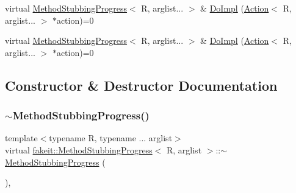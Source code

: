 \begin{DoxyCompactItemize}
\item 
virtual \mbox{\hyperlink{structfakeit_1_1MethodStubbingProgress}{Method\+Stubbing\+Progress}}$<$ R, arglist... $>$ \& \mbox{\hyperlink{structfakeit_1_1MethodStubbingProgress_a73218fd396f0096f93462f2d4656c509}{Do\+Impl}} (\mbox{\hyperlink{structfakeit_1_1Action}{Action}}$<$ R, arglist... $>$ $\ast$action)=0
\item 
virtual \mbox{\hyperlink{structfakeit_1_1MethodStubbingProgress}{Method\+Stubbing\+Progress}}$<$ R, arglist... $>$ \& \mbox{\hyperlink{structfakeit_1_1MethodStubbingProgress_a73218fd396f0096f93462f2d4656c509}{Do\+Impl}} (\mbox{\hyperlink{structfakeit_1_1Action}{Action}}$<$ R, arglist... $>$ $\ast$action)=0
\end{DoxyCompactItemize}


\subsection{Constructor \& Destructor Documentation}
\mbox{\label{structfakeit_1_1MethodStubbingProgress_aed2c96ce537706935976943354c49616}} 
\subsubsection{\texorpdfstring{$\sim$MethodStubbingProgress()}{~MethodStubbingProgress()}\hspace{0.1cm}{\footnotesize\ttfamily [1/9]}}
{\footnotesize\ttfamily template$<$typename R, typename ... arglist$>$ \\
virtual \mbox{\hyperlink{structfakeit_1_1MethodStubbingProgress}{fakeit\+::\+Method\+Stubbing\+Progress}}$<$ R, arglist $>$\+::$\sim$\mbox{\hyperlink{structfakeit_1_1MethodStubbingProgress}{Method\+Stubbing\+Progress}} (\begin{DoxyParamCaption}{ }\end{DoxyParamCaption})\hspace{0.3cm}{\ttfamily [inline]}, {\ttfamily [virtual]}}

\mbox{\label{structfakeit_1_1MethodStubbingProgress_aed2c96ce537706935976943354c49616}} 
